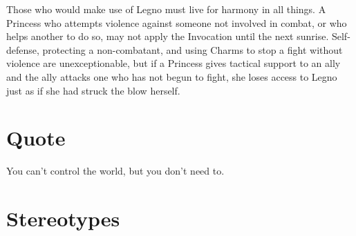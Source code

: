 Those who would make use of Legno must live for harmony in all things. A Princess who attempts violence against someone not involved in combat, or who helps another to do so, may not apply the Invocation until the next sunrise. Self-defense, protecting a non-combatant, and using Charms to stop a fight without violence are unexceptionable, but if a Princess gives tactical support to an ally and the ally attacks one who has not begun to fight, she loses access to Legno just as if she had struck the blow herself. 

\section*{Quote}

You can't control the world, but you don't need to.

\section*{Stereotypes}

